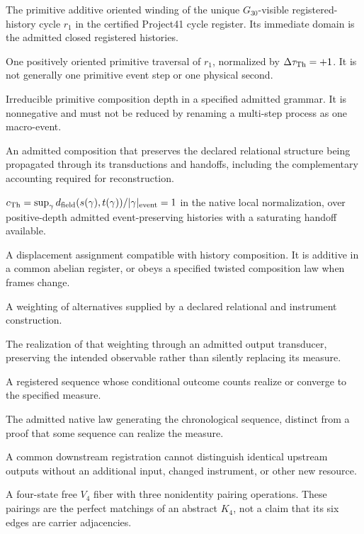 \begin{description}[style=nextline,leftmargin=1.5em,font=\normalfont\bfseries]
\item[Thalean time]
The primitive additive oriented winding of the unique $G_{30}$-visible registered-history cycle $r_1$ in the certified Project41 cycle register. Its immediate domain is the admitted closed registered histories.
\item[Thalean tick]
One positively oriented primitive traversal of $r_1$, normalized by $\Delta\tau_{\mathrm{Th}}=+1$. It is not generally one primitive event step or one physical second.
\item[Event depth]
Irreducible primitive composition depth in a specified admitted grammar. It is nonnegative and must not be reduced by renaming a multi-step process as one macro-event.
\item[Event-preserving history]
An admitted composition that preserves the declared relational structure being propagated through its transductions and handoffs, including the complementary accounting required for reconstruction.
\item[Thalean causal datum]
$c_{\mathrm{Th}}=\sup_\gamma d_{\mathrm{field}}(s(\gamma),t(\gamma))/|\gamma|_{\mathrm{event}}=1$ in the native local normalization, over positive-depth admitted event-preserving histories with a saturating handoff available.
\item[Transport cocycle]
A displacement assignment compatible with history composition. It is additive in a common abelian register, or obeys a specified twisted composition law when frames change.
\item[Measure]
A weighting of alternatives supplied by a declared relational and instrument construction.
\item[Registered measure]
The realization of that weighting through an admitted output transducer, preserving the intended observable rather than silently replacing its measure.
\item[Frequency realization]
A registered sequence whose conditional outcome counts realize or converge to the specified measure.
\item[Process provenance]
The admitted native law generating the chronological sequence, distinct from a proof that some sequence can realize the measure.
\item[Registration nonamplification]
A common downstream registration cannot distinguish identical upstream outputs without an additional input, changed instrument, or other new resource.
\item[Local orientation cell]
A four-state free $V_4$ fiber with three nonidentity pairing operations. These pairings are the perfect matchings of an abstract $K_4$, not a claim that its six edges are carrier adjacencies.

\end{description}
